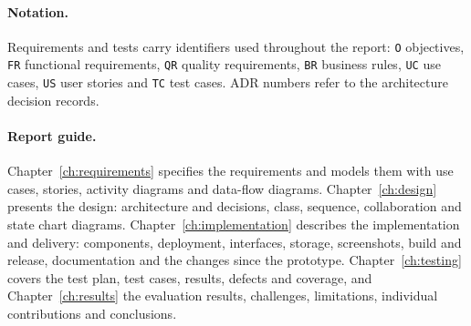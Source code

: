 \paragraph{Notation.} Requirements and tests carry identifiers used
throughout the report: \texttt{O} objectives, \texttt{FR} functional
requirements, \texttt{QR} quality requirements, \texttt{BR} business rules,
\texttt{UC} use cases, \texttt{US} user stories and \texttt{TC} test cases.
ADR numbers refer to the architecture decision records.

\paragraph{Report guide.} Chapter~\ref{ch:requirements} specifies the
requirements and models them with use cases, stories, activity diagrams and
data-flow diagrams. Chapter~\ref{ch:design} presents the design: architecture
and decisions, class, sequence, collaboration and state chart diagrams.
Chapter~\ref{ch:implementation} describes the implementation and delivery:
components, deployment, interfaces, storage, screenshots, build and release,
documentation and the changes since the prototype.
Chapter~\ref{ch:testing} covers the test plan, test cases, results, defects
and coverage, and Chapter~\ref{ch:results} the evaluation results, challenges,
limitations, individual contributions and conclusions.
